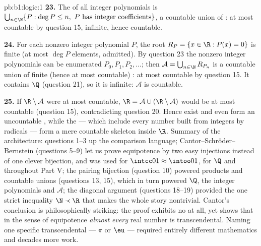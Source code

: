 \begin{solution}{pb:b1:logic:1}
\textbf{23.} The  of all integer polynomials is $\bigcup_{n \in
\N} \{P : \deg P \leq n,\ P \text{ has integer coefficients}\}$, a
countable union of : at most countable by
question 15, infinite, hence countable.

\textbf{24.} For each nonzero integer polynomial $P$, the root 
$R_P = \{x \in \R : P(x) = 0\}$ is finite (at most $\deg P$
elements, admitted). By question 23 the nonzero integer polynomials
can be enumerated $P_0, P_1, P_2, \dots$; then $\mathcal{A} =
\bigcup_{n \in \N} R_{P_n}$ is a countable union of finite (hence
at most countable) : at most countable by question 15. It
contains $\Q$ (question 21), so it is infinite: $\mathcal{A}$ is
countable.

\textbf{25.} If $\R \setminus \mathcal{A}$ were at most countable,
$\R = \mathcal{A} \cup (\R \setminus \mathcal{A})$ would be at most
countable (question 15), contradicting question 20. Hence
 exist and even form an uncountable ,
while the  --- which include every number built
from integers by radicals --- form a mere countable skeleton
inside $\R$. Summary of the architecture: questions 1--3  up the
comparison language; Cantor--Schr\"oder--Bernstein (questions
5--9) let us prove equipotence by two easy injections instead of
one clever bijection, and was used for $\intcc01 \approx \intoo01$,
for $\Q$ and throughout Part V; the pairing bijection (question
10) powered products and countable unions (questions 13, 15),
which in turn powered $\Q$, the integer polynomials and
$\mathcal{A}$; the diagonal argument (questions 18--19) provided
the one strict inequality $\N \prec \R$ that makes the whole story
nontrivial. Cantor's conclusion is philosophically striking: the
proof exhibits no  at all, yet shows that in
the sense of equipotence \emph{almost every} real number is
transcendental. Naming one specific transcendental --- $\pi$ or
$\eu$ --- required entirely different mathematics and decades more
work.
\end{solution}
